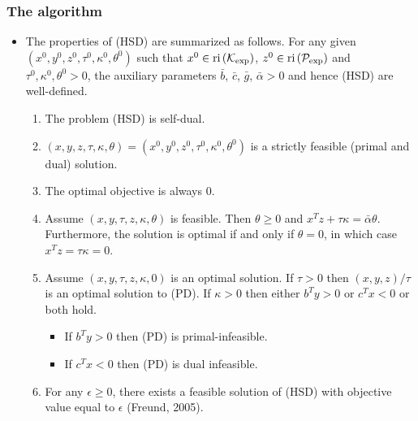 \documentclass{beamer}
\def\interior{\protect{\textnormal{ri}}}
\begin{document}
\begin{frame}
	\frametitle{The algorithm}
	\begin{itemize}
		\item The properties of (HSD) are summarized as follows.
			For any given $(x^0, y^0, z^0, \tau^0, \kappa^0, \theta^0)$ such that $x^0 \in \interior \left(\mathcal{K}_{\exp}\right)$, $z^0 \in \interior \left(\mathcal{P}_{\exp}\right)$ and $\tau^0, \kappa^0, \theta^0 > 0$, the auxiliary parameters $\bar{b}$, $\bar{c}$, $\bar{g}$, $\bar{\alpha}>0$ and hence (HSD) are well-defined.
			\begin{enumerate}
				\item The problem (HSD) is \textnormal{self-dual}.
				\item $(x,y,z,\tau,\kappa, \theta) = (x^0,y^0,z^0, \tau^0,\kappa^0, \theta^0)$ is a strictly feasible (primal and dual) solution.
				\item The optimal objective is always 0. 
				\item Assume $(x,y, \tau, z,\kappa, \theta)$ is feasible. Then $\theta\geq 0$ and $x^T z + \tau \kappa = \bar{\alpha} \theta$. Furthermore, the solution is optimal if and only if $\theta=0$, in which case $x^T z = \tau\kappa = 0$.
				\item Assume $(x,y, \tau, z,\kappa, 0)$ is an optimal solution. If $\tau>0$ then $(x,y,z)/\tau$ is an optimal solution to (PD). If $\kappa>0$ then either $b^Ty>0$ or $c^Tx<0$ or both hold. 
				\begin{itemize}
					\item If $b^T y>0$ then (PD) is primal-infeasible.
					\item If $c^T x < 0$ then (PD) is dual infeasible.
				\end{itemize}
				\item For any $\epsilon \geq 0$, there exists a feasible solution of (HSD) with objective value equal to $\epsilon$ (Freund, 2005).
			\end{enumerate}
	\end{itemize}
\end{frame}
\end{document}
